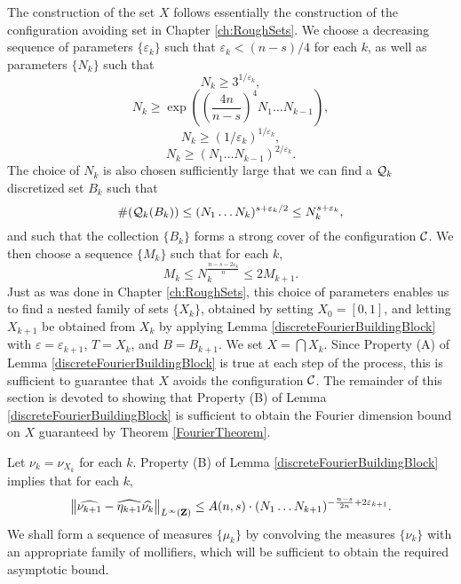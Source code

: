 \begin{comment}
    Combining \eqref{fourierdim1}, \eqref{fourierdim2}, and \eqref{fourierdim3}, we conclude that there exists a constant $C$ such that with probability at least
    \[ 1 - 2 \exp \left( \frac{-N^{d-s/n}}{A^{1/n} (\log N)^{1/n}} \right) - 1/\log N - \frac{2^{d+1}}{N^{c \log N - d}} \geq 1 - C / \log N, \]
    the set $X$ avoids $K$, and for all $m \in \{ -N, \dots, N \}^d$,
    \[ |\widehat{f}(m)| \leq \frac{C (\log N)^{1-1/n}}{N^{d-s/n}}. \qedhere \]
\end{proof}
\end{comment}

The construction of the set $X$ follows essentially the construction of the configuration avoiding set in Chapter \ref{ch:RoughSets}. We choose a decreasing sequence of parameters $\{ \varepsilon_k \}$ such that $\varepsilon_k < (n-s)/4$ for each $k$, as well as parameters $\{ N_k \}$ such that
%
\[ N_k \geq 3^{1/\varepsilon_k}, \]
%
\[ N_k \geq \exp \left( \left( \frac{4n}{n-s} \right)^4 N_1 \dots N_{k-1} \right), \]
%
\[ N_k \geq (1/\varepsilon_k)^{1/\varepsilon_k}, \]
%
\begin{equation} \label{equation13895891489132}
    N_k \geq (N_1 \dots N_{k-1})^{2/\varepsilon_k}.
\end{equation}
%
The choice of $N_k$ is also chosen sufficiently large that we can find a $\operatorname{\mathcal{Q}}_k$ discretized set $B_k$ such that
%
\[ \#(\operatorname{\mathcal{Q}}_k(B_k)) \leq (N_1 \dots N_k)^{s + \varepsilon_k/2} \leq N_k^{s + \varepsilon_k}, \]
%
and such that the collection $\{ B_k \}$ forms a strong cover of the configuration $\operatorname{\mathcal{C}}$. We then choose a sequence $\{ M_k \}$  such that for each $k$,
%
\[ M_k \leq N_k^{\frac{n-s-2\varepsilon_k}{n}} \leq 2 M_{k+1}. \]
%
Just as was done in Chapter \ref{ch:RoughSets}, this choice of parameters enables us to find a nested family of sets $\{ X_k \}$, obtained by setting $X_0 = [0,1]$, and letting $X_{k+1}$ be obtained from $X_k$ by applying Lemma \ref{discreteFourierBuildingBlock} with $\varepsilon = \varepsilon_{k+1}$, $T = X_k$, and $B = B_{k+1}$. We set $X = \bigcap X_k$. Since Property (A) of Lemma \eqref{discreteFourierBuildingBlock} is true at each step of the process, this is sufficient to guarantee that $X$ avoids the configuration $\operatorname{\mathcal{C}}$. The remainder of this section is devoted to showing that Property (B) of Lemma \ref{discreteFourierBuildingBlock} is sufficient to obtain the Fourier dimension bound on $X$ guaranteed by Theorem \ref{FourierTheorem}.

Let $\nu_k = \nu_{X_k}$ for each $k$. Property (B) of Lemma \ref{discreteFourierBuildingBlock} implies that for each $k$,
%
\begin{equation} \label{equation77770123091293120}
    \left\| \widehat{\nu_{k+1}} - \widehat{\eta_{k+1}} \widehat{\nu_k} \right\|_{L^\infty(\operatorname{\mathbf{Z}})} \leq A(n,s) \cdot (N_1 \dots N_{k+1})^{- \frac{n-s}{2n} + 2\varepsilon_{k+1}}.
\end{equation}
%
We shall form a sequence of measures $\{ \mu_k \}$ by convolving the measures $\{ \nu_k \}$ with an appropriate family of mollifiers, which will be sufficient to obtain the required asymptotic bound.


